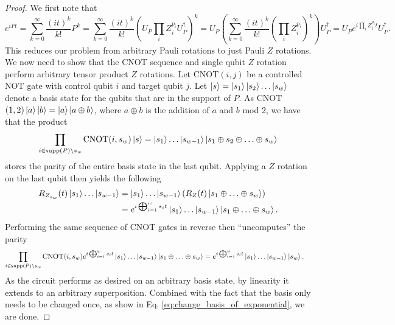\begin{proof}
    We first note that 
    \begin{equation}
        e^{i P t} = \sum_{k = 0}^\infty \frac{(i t)^k}{k!} P^k = \sum_{k = 0}^\infty \frac{(i t)^k}{k!} (U_P \prod_i Z_i^{p_i} U_P^\dagger)^k = U_P \left(\sum_{k = 0}^\infty \frac{(i t)^k}{k!} ( \prod_i Z_i^{p_i})^k \right) U_P^\dagger = U_P e^{i \prod_i Z_i^{p_i} t} U_P^\dagger. \label{eq:change_basis_of_exponential}
    \end{equation}
    This reduces our problem from arbitrary Pauli rotations to just Pauli $Z$ rotations. We now need to show that the CNOT sequence and single qubit $Z$ rotation perform arbitrary tensor product $Z$ rotations. Let CNOT$(i,j)$ be a controlled NOT gate with control qubit $i$ and target qubit $j$. Let $\ket{s} = \ket{s_1} \ket{s_2} \ldots \ket{s_w}$ denote a basis state for the qubits that are in the support of $P$. As CNOT$(1,2) \ket{a}\ket{b} = \ket{a} \ket{a \oplus b}$, where $a \oplus b$ is the addition of $a$ and $b$ mod 2, we have that the product
    \begin{equation}
        \prod_{i \in {\rm supp}(P) \setminus s_w} {\rm CNOT}(i, s_w) \ket{s} = \ket{s_1} \ldots \ket{s_{w-1}} \ket{s_1 \oplus s_2 \oplus \ldots \oplus s_w}
    \end{equation}
    stores the parity of the entire basis state in the last qubit. Applying a $Z$ rotation on the last qubit then yields the following
    \begin{align}
        R_{Z_{s_w}}(t) \ket{s_1} \ldots \ket{s_{w-1}} &= \ket{s_1} \ldots \ket{s_{w- 1}} \left(R_Z(t) \ket{s_1 \oplus \ldots \oplus s_w} \right) \\
        &= e^{i \bigoplus_{i = 1}^w s_i t} \ket{s_1} \ldots \ket{s_{w- 1}} \ket{s_1 \oplus \ldots \oplus s_w}.
    \end{align}
    Performing the same sequence of CNOT gates in reverse then ``uncomputes'' the parity
    \begin{align}
        \prod_{i \in {\rm supp}(P) \setminus s_w} {\rm CNOT}(i, s_w) e^{i \bigoplus_{i = 1}^w s_i t} \ket{s_1} \ldots \ket{s_{w- 1}} \ket{s_1 \oplus \ldots \oplus s_w} &= e^{i \bigoplus_{i = 1}^w s_i t} \ket{s_1} \ldots \ket{s_{w- 1}} \ket{s_w}.
    \end{align}
    As the circuit performs as desired on an arbitrary basis state, by linearity it extends to an arbitrary superposition. Combined with the fact that the basis only needs to be changed once, as show in Eq. \eqref{eq:change_basis_of_exponential}, we are done.
\end{proof}

